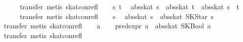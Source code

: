 \begin{isabellebody}
\ \ \ \ \isamarkupfalse%
\ {}transfer{}\ metis\ skat{}con{}refl{}\isanewline
{}\isamarkupfalse%
\isanewline
\ \ \isamarkupfalse%
\ s\ t\ \isamarkupfalse%
\ {}abs{}skat\ s\ {}\ abs{}skat\ t\ {}\ abs{}skat\ {}s\ {}{}{}\ t{}{}\isanewline
\ \ \ \ \isamarkupfalse%
\ {}transfer{}\ metis\ skat{}con{}refl{}\isanewline
{}\isamarkupfalse%
\isanewline
\ \ \isamarkupfalse%
\ s\ \isamarkupfalse%
\ {}abs{}skat\ s\ {}\ abs{}skat\ {}SKStar\ s{}{}\isanewline
\ \ \ \ \isamarkupfalse%
\ {}transfer{}\ metis\ skat{}con{}refl{}\isanewline
{}\isamarkupfalse%
\isanewline
\ \ \isamarkupfalse%
\ a\isanewline
\ \ \isamarkupfalse%
\ {}pred{}expr\ a\ {}\ abs{}skat\ {}SKBool\ a{}{}\isanewline
\ \ \ \ \isamarkupfalse%
\ {}transfer{}\ metis\ skat{}con{}refl{}\isanewline

\end{isabellebody}
